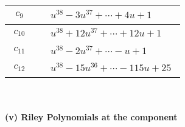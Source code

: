 \documentclass[1p]{elsarticle_modified}
\theoremstyle{definition}
\begin{document}
\begin{tabular}{m{50pt}|m{274pt}}
\hline $$\begin{aligned}c_{9}\end{aligned}$$&$\begin{aligned}
&u^{38}-3 u^{37}+\cdots+4 u+1
\end{aligned}$\\
\hline $$\begin{aligned}c_{10}\end{aligned}$$&$\begin{aligned}
&u^{38}+12 u^{37}+\cdots+12 u+1
\end{aligned}$\\
\hline $$\begin{aligned}c_{11}\end{aligned}$$&$\begin{aligned}
&u^{38}-2 u^{37}+\cdots- u+1
\end{aligned}$\\
\hline $$\begin{aligned}c_{12}\end{aligned}$$&$\begin{aligned}
&u^{38}-15 u^{36}+\cdots-115 u+25
\end{aligned}$\\
\hline
\end{tabular}\\~\\
\newpage\renewcommand{\arraystretch}{1}
\flushleft \textbf{(v) Riley Polynomials at the component}\newline \\
\end{document}
